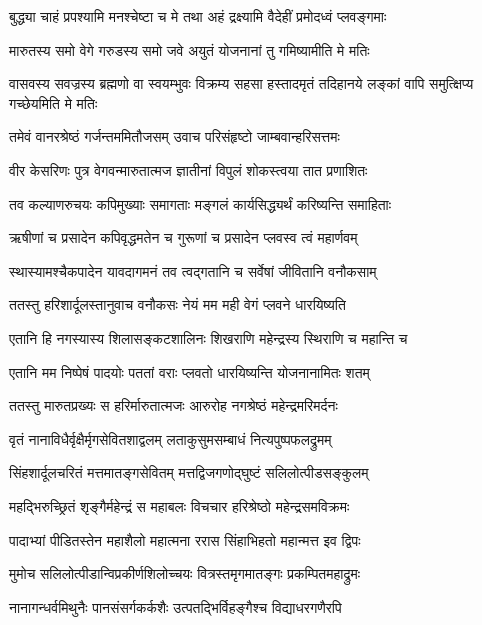 \twolineshloka
{बुद्ध्या चाहं प्रपश्यामि मनश्चेष्टा च मे तथा}
{अहं द्रक्ष्यामि वैदेहीं प्रमोदध्वं प्लवङ्गमाः} %

\twolineshloka
{मारुतस्य समो वेगे गरुडस्य समो जवे}
{अयुतं योजनानां तु गमिष्यामीति मे मतिः} %

\threelineshloka
{वासवस्य सवज्रस्य ब्रह्मणो वा स्वयम्भुवः}
{विक्रम्य सहसा हस्तादमृतं तदिहानये}
{लङ्कां वापि समुत्क्षिप्य गच्छेयमिति मे मतिः} %

\twolineshloka
{तमेवं वानरश्रेष्ठं गर्जन्तममितौजसम्}
{उवाच परिसंहृष्टो जाम्बवान्हरिसत्तमः} %

\twolineshloka
{वीर केसरिणः पुत्र वेगवन्मारुतात्मज}
{ज्ञातीनां विपुलं शोकस्त्वया तात प्रणाशितः} %

\twolineshloka
{तव कल्याणरुचयः कपिमुख्याः समागताः}
{मङ्गलं कार्यसिद्ध्यर्थं करिष्यन्ति समाहिताः} %

\twolineshloka
{ऋषीणां च प्रसादेन कपिवृद्धमतेन च}
{गुरूणां च प्रसादेन प्लवस्व त्वं महार्णवम्} %

\twolineshloka
{स्थास्यामश्चैकपादेन यावदागमनं तव}
{त्वद्गतानि च सर्वेषां जीवितानि वनौकसाम्} %

\twolineshloka
{ततस्तु हरिशार्दूलस्तानुवाच वनौकसः}
{नेयं मम मही वेगं प्लवने धारयिष्यति} %

\twolineshloka
{एतानि हि नगस्यास्य शिलासङ्कटशालिनः}
{शिखराणि महेन्द्रस्य स्थिराणि च महान्ति च} %

\twolineshloka
{एतानि मम निष्पेषं पादयोः पततां वराः}
{प्लवतो धारयिष्यन्ति योजनानामितः शतम्} %

\twolineshloka
{ततस्तु मारुतप्रख्यः स हरिर्मारुतात्मजः}
{आरुरोह नगश्रेष्ठं महेन्द्रमरिमर्दनः} %

\twolineshloka
{वृतं नानाविधैर्वृक्षैर्मृगसेवितशाद्वलम्}
{लताकुसुमसम्बाधं नित्यपुष्पफलद्रुमम्} %

\twolineshloka
{सिंहशार्दूलचरितं मत्तमातङ्गसेवितम्}
{मत्तद्विजगणोद्घुष्टं सलिलोत्पीडसङ्कुलम्} %

\twolineshloka
{महद्भिरुच्छ्रितं शृङ्गैर्महेन्द्रं स महाबलः}
{विचचार हरिश्रेष्ठो महेन्द्रसमविक्रमः} %

\twolineshloka
{पादाभ्यां पीडितस्तेन महाशैलो महात्मना}
{ररास सिंहाभिहतो महान्मत्त इव द्विपः} %

\twolineshloka
{मुमोच सलिलोत्पीडान्विप्रकीर्णशिलोच्चयः}
{वित्रस्तमृगमातङ्गः प्रकम्पितमहाद्रुमः} %

\twolineshloka
{नानागन्धर्वमिथुनैः पानसंसर्गकर्कशैः}
{उत्पतद्भिर्विहङ्गैश्च विद्याधरगणैरपि} %

